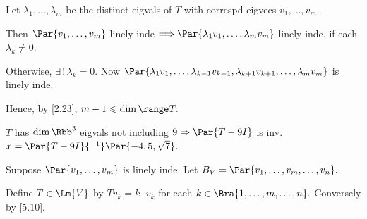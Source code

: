 \par\quad
Let $\lambda_1,\dots,\lambda_m$ be the distinct eigvals of $T$ with correspd eigvecs $v_1,\dots,v_m.$\par\quad%
\par\quad
Then $\Par{v_1,\dots,v_m}$ linely inde $\Longrightarrow\Par{\lambda_1 v_1,\dots,\lambda_m v_m}$ linely inde, if each $\lambda_k\neq 0.$\par\quad
Otherwise, $\exists\,!\,\lambda_k=0.$ Now $\Par{\lambda_1v_1,\dots,\lambda_{k-1}v_{k-1},\lambda_{k+1}v_{k+1},\dots,\lambda_mv_m}$ is linely inde.\par\quad
Hence, by [2.23], $m-1\leqslant\dim\range T.$\PfEnd
\SepLine

$T$ has $\dim\Rbb^3$ eigvals not including $9\Rightarrow\Par{T-9I}$ is inv. $x=\Par{T-9I}{^{-1}}\Par{-4,5,\sqrt{7}}.$\PfEnd
\SepLine

Suppose $\Par{v_1,\dots,v_m}$ is linely inde. Let $B_V=\Par{v_1,\dots,v_m,\dots,v_n}.$\par
\Blind{\Solution} Define $T\in\Lm{V}$ by $Tv_k=k\cdot v_k$ for each $k\in\Bra{1,\dots,m,\dots,n}.$ Conversely by [5.10].\PfEnd\vspace{-4pt}
\SepLine

